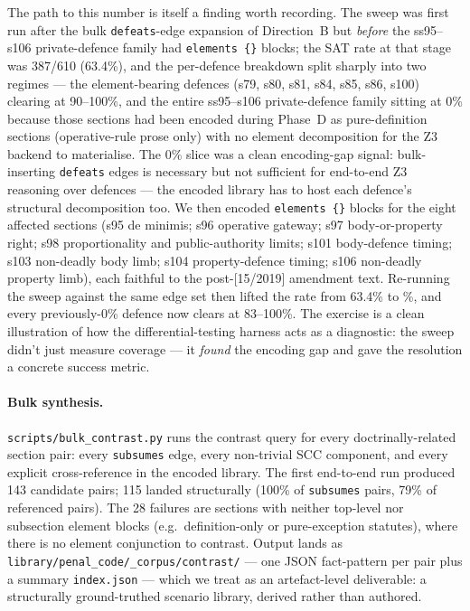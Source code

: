 The path to this number is itself a finding worth recording.
The sweep was first run after the bulk \texttt{defeats}-edge
expansion of Direction~B but \emph{before} the
ss95--s106 private-defence family had \texttt{elements~\{\}}
blocks; the SAT rate at that stage was 387/610
(63.4\%), and the per-defence breakdown split sharply into
two regimes — the element-bearing defences (s79, s80, s81,
s84, s85, s86, s100) clearing at 90--100\%, and the entire
ss95--s106 private-defence family sitting at 0\% because
those sections had been encoded during Phase~D as
pure-definition sections (operative-rule prose only) with
no element decomposition for the Z3 backend to materialise.
The 0\% slice was a clean encoding-gap signal: bulk-inserting
\texttt{defeats} edges is necessary but not sufficient for
end-to-end Z3 reasoning over defences --- the encoded
library has to host each defence's structural decomposition
too. We then encoded \texttt{elements~\{\}} blocks for the
eight affected sections (s95 de minimis; s96 operative
gateway; s97 body-or-property right; s98 proportionality and
public-authority limits; s101 body-defence timing; s103
non-deadly body limb; s104 property-defence timing; s106
non-deadly property limb), each faithful to the post-[15/2019]
amendment text. Re-running the sweep against the same edge
set then lifted the rate from 63.4\% to
\statDefeatsCoverageRate{}\%, and every previously-0\% defence
now clears at 83--100\%. The exercise is a clean illustration
of how the differential-testing harness acts as a
diagnostic: the sweep didn't just measure coverage — it
\emph{found} the encoding gap and gave the resolution a
concrete success metric.

\paragraph{Bulk synthesis.} \texttt{scripts/bulk\_contrast.py}
runs the contrast query for every doctrinally-related section
pair: every \texttt{subsumes} edge, every non-trivial SCC
component, and every explicit cross-reference in the encoded
library. The first end-to-end run produced 143 candidate pairs;
115 landed structurally (100\% of \texttt{subsumes} pairs, 79\%
of referenced pairs). The 28 failures are sections with neither
top-level nor subsection element blocks (e.g.\ definition-only or
pure-exception statutes), where there is no element conjunction
to contrast. Output lands as
\texttt{library/penal\_code/\_corpus/contrast/} --- one JSON
fact-pattern per pair plus a summary \texttt{index.json} ---
which we treat as an artefact-level deliverable: a structurally
ground-truthed scenario library, derived rather than authored.

